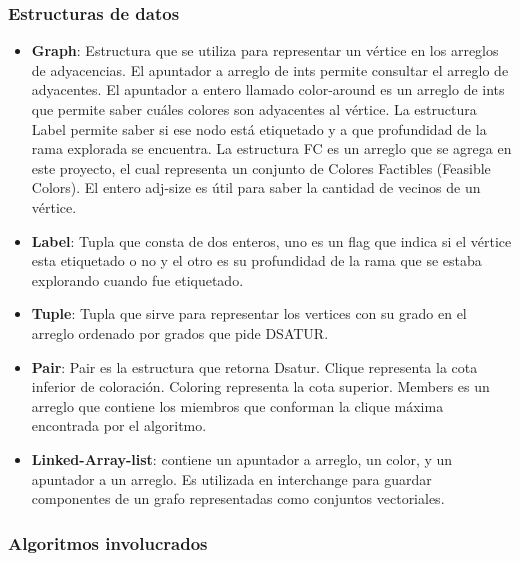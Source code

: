 \documentclass[a4paper,10pt]{article}
\begin{document}
\subsubsection{Estructuras de datos}
\begin{itemize}
 \item \textbf{Graph}: Estructura que se utiliza para representar
       un v\'ertice en los arreglos de adyacencias. El apuntador a arreglo de ints
       permite consultar el arreglo de adyacentes. El apuntador a entero llamado
       color-around es un arreglo de ints que permite saber cuáles colores
       son adyacentes al v\'ertice. La estructura Label permite saber
       si ese nodo est\'a etiquetado y a que profundidad de la rama
       explorada se encuentra. La estructura FC es un arreglo que se agrega en este 
       proyecto, el cual representa un conjunto de Colores Factibles (Feasible Colors).
	El entero adj-size es útil para saber la cantidad de vecinos de un vértice.
 \item \textbf{Label}: Tupla que consta de dos enteros, uno es un flag
       que indica si el v\'ertice esta etiquetado o no y el otro es su
       profundidad de la rama que se estaba explorando cuando fue
       etiquetado.
 \item \textbf{Tuple}: Tupla que sirve para representar los vertices con su 
       grado en el arreglo ordenado por grados que pide DSATUR.
 \item \textbf{Pair}: Pair es la estructura que retorna Dsatur.
       Clique representa la cota inferior de coloración.
       Coloring representa la cota superior.
       Members es un arreglo que contiene los miembros
       que conforman la clique máxima encontrada por el algoritmo.
 \item \textbf{Linked-Array-list}: contiene un apuntador a arreglo, un
       color, y un apuntador a un arreglo. Es utilizada en interchange 
       para guardar componentes de un grafo representadas como conjuntos
       vectoriales.
\end{itemize}
 
\subsubsection{Algoritmos involucrados}
\end{document}

